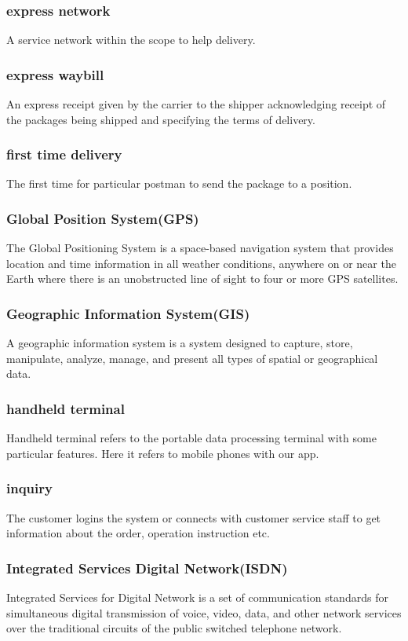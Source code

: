 \documentclass[12pt]{scrreprt}
\begin{document}
\begin{spacing}{0.7}
\subsubsection{express network}
A service network within the scope to help delivery.
\subsubsection{express waybill}
An express receipt given by the carrier to the shipper acknowledging receipt of the packages being shipped and specifying the terms of delivery.
\subsubsection{first time delivery}
The first time for particular postman to send the package to a position.
\subsubsection{Global Position System(GPS)}
The Global Positioning System is a space-based navigation system that provides location and time information in all weather conditions, anywhere on or near the Earth where there is an unobstructed line of sight to four or more GPS satellites.
\subsubsection{Geographic Information System(GIS)}
A geographic information system is a system designed to capture, store, manipulate, analyze, manage, and present all types of spatial or geographical data.
\subsubsection{handheld terminal}
Handheld terminal refers to the portable data processing terminal with some particular features. Here it refers to mobile phones with our app.
\subsubsection{inquiry}
The customer logins the system or connects with customer service staff to get information about the order, operation instruction etc.
\subsubsection{Integrated Services Digital Network(ISDN)}
Integrated Services for Digital Network is a set of communication standards for simultaneous digital transmission of voice, video, data, and other network services over the traditional circuits of the public switched telephone network.

\end{spacing}
\end{document}
